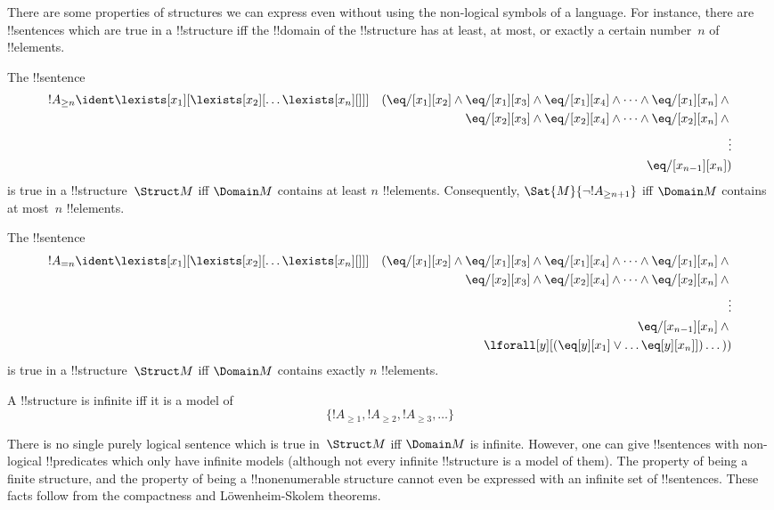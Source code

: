 \documentclass[../../include/open-logic-section]{subfiles}
\begin{document}


\begin{explain}
There are some properties of structures we can express even without
using the non-logical symbols of a language.  For instance, there are
!!{sentence}s which are true in a !!{structure} iff the !!{domain} of
the !!{structure} has at least, at most, or exactly a certain
number~$n$ of !!{element}s.
\end{explain}

\begin{prop}
The !!{sentence}
\begin{align*}
!A_{\ge n} & \ident \lexists[x_1][\lexists[x_2][\dots\lexists[x_n][{}]]] &
  (\eq/[x_1][x_2] \land {} 
  \eq/[x_1][x_3] \land \eq/[x_1][x_4] \land \dots \land \eq/[x_1][x_n] \land {}\\
& & \eq/[x_2][x_3] \land \eq/[x_2][x_4] \land \dots \land {} \eq/[x_2][x_n] \land {} \\
& & \vdots\\
& & \eq/[x_{n-1}][x_n])
\end{align*}
is true in a !!{structure}~$\Struct M$ iff $\Domain M$ contains at
least $n$ !!{element}s. Consequently, $\Sat{M}{\lnot !A_{\ge n+1}}$ iff
$\Domain M$ contains at most~$n$ !!{element}s.

\end{prop}

\begin{prop}
The !!{sentence}
\begin{align*}
!A_{= n} & \ident \lexists[x_1][\lexists[x_2][\dots\lexists[x_n][{}]]] &
  (\eq/[x_1][x_2] \land {} 
  \eq/[x_1][x_3] \land \eq/[x_1][x_4] \land \dots \land \eq/[x_1][x_n] \land {}\\
& & \eq/[x_2][x_3] \land \eq/[x_2][x_4] \land \dots \land {} \eq/[x_2][x_n] \land {} \\
& & \vdots\\
& & \eq/[x_{n-1}][x_n] \land {} \\
& &\lforall[y][(\eq[y][x_1] \lor \dots \eq[y][x_n]])\dots))
\end{align*}
is true in a !!{structure}~$\Struct M$ iff $\Domain M$ contains
exactly $n$ !!{element}s.
\end{prop}

\begin{prop}
A !!{structure} is infinite iff it is a model of
\[
\{!A_{\ge 1}, !A_{\ge 2}, !A_{\ge 3}, \dots \}
\]
\end{prop}

There is no single purely logical sentence which is true in~$\Struct
M$ iff $\Domain M$ is infinite.  However, one can give !!{sentence}s with
non-logical !!{predicate}s which only have infinite models (although
not every infinite !!{structure} is a model of them).  The property of
being a finite structure, and the property of being a
!!{nonenumerable} structure cannot even be expressed with an infinite
set of !!{sentence}s.  These facts follow from the compactness and
L\"owenheim-Skolem theorems.
\end{document}
